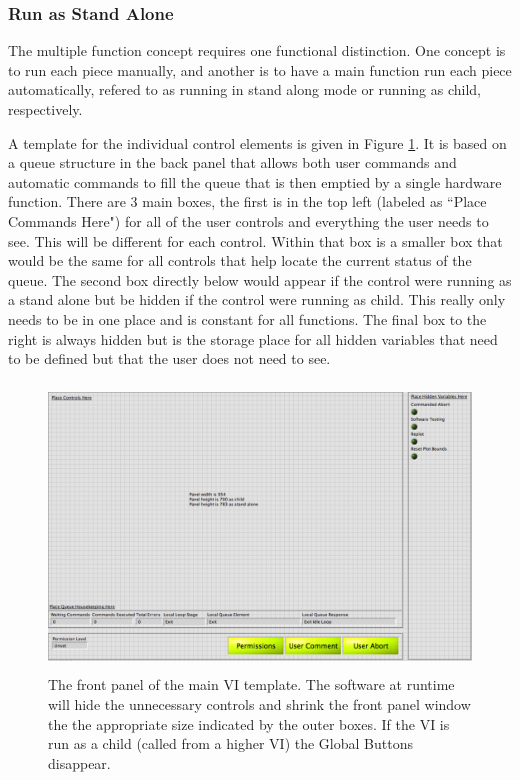 \subsubsection{Run as Stand Alone}

The multiple function concept requires one functional distinction. One concept is to run each piece manually, and another is to have a main function run each piece automatically, refered to as running in stand along mode or running as child, respectively.   

A template for the individual control elements is given in Figure \ref{Fig:VITemplate}. It is based on a queue structure in the back panel that allows both user commands and automatic commands to fill the queue that is then emptied by a single hardware function. There are 3 main boxes, the first is in the top left (labeled as ``Place Commands Here") for all of the user controls and everything the user needs to see. This will be different for each control. Within that box is a smaller box that would be the same for all controls that help locate the current status of the queue. The second box directly below would appear if the control were running as a stand alone but be hidden if the control were running as child. This really only needs to be in one place and is constant for all functions. The final box to the right is always hidden but is the storage place for all hidden variables that need to be defined but that the user does not need to see. 

\begin{figure}[!h]\centering
\includegraphics[height=3in]{Figures/MainVITemplate.pdf}
\caption{The front panel of the main VI template. The software at runtime will hide the unnecessary controls and shrink the front panel window the the appropriate size indicated by the outer boxes. If the VI is run as a child (called from a higher VI) the Global Buttons disappear. }\label{Fig:VITemplate}
\end{figure}

